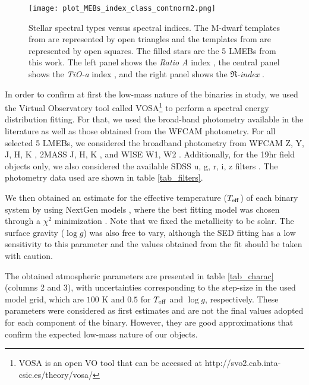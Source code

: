 \documentclass[fleqn,usenatbib]{mnras}
\begin{document}
\begin{figure*}
\begin{center}
\texttt{[image: plot\_MEBs\_index\_class\_contnorm2.png]}
\caption{Stellar spectral types versus spectral indices. The M-dwarf templates from \citet{Leggett00} are represented by open triangles and the templates from \citet{Cruz02} are represented by open squares. The filled stars are the 5 LMEBs from this work. The left panel shows the {\it Ratio A} index \citep{Kirkpatrick91}, the central panel shows the {\it TiO-a} index \citep{Kirkpatrick99}, and the right panel shows the {\it $\Re$-index} \citep{Aberasturi14}.}
\label{figSpecInd}
\end{center}
\end{figure*}


In order to confirm at first the low-mass nature of the binaries in study, we used the Virtual Observatory tool called VOSA\footnote{VOSA is an open VO tool that can be accessed at http://svo2.cab.inta-csic.es/theory/vosa/} \citep[Virtual Observatory SED Analyzer,][]{Bayo08} to perform a spectral energy distribution fitting. For that, we used the broad-band photometry available in the literature as well as those obtained from the WFCAM photometry. For all selected 5 LMEBs, we considered the broadband photometry from WFCAM Z, Y, J, H, K \citep[Wide-Field Camera, ][]{Hodgkin09}, 2MASS J, H, K \citep[Two Micron All Sky Survey, ][]{Skrutskie06}, and WISE W1, W2 \citep[Wide-field Infrared Survey Explorer, ][]{Wright10}. Additionally, for the 19hr field objects only, we also considered the available SDSS u, g, r, i, z filters \citep[Sloan Digital Sky Survey Data Release 7, ][]{York00}. The photometry data used are shown in table \ref{tab_filters}.

We then obtained an estimate for the effective temperature ($T_{\rm eff}$) of each binary system by using NextGen models \citep[][and references therein]{Baraffe98,Hauschildt99}, where the best fitting model was chosen through a $\chi^2$ minimization \citep[for details, see][]{Bayo08}. Note that we fixed the metallicity to be solar. The surface gravity ($\log g$) was also free to vary, although the SED fitting has a low sensitivity to this parameter and the values obtained from the fit should be taken with caution.

The obtained atmospheric parameters are presented in table \ref{tab_charac} (columns 2 and 3), with uncertainties corresponding to the step-size in the used model grid, which are $100$ K and $0.5$ for $T_{\rm eff}$ and $\log g$, respectively. These parameters were considered as first estimates and are not the final values adopted for each component of the binary. However, they are good approximations that confirm the expected low-mass nature of our objects.
\end{document}

